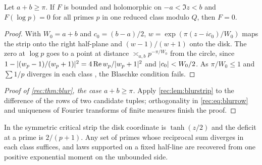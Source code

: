 \begin{lemma}\label{rec:lem:blurstrip}
Let $a+b\ge\pi$. If $F$ is bounded and holomorphic on $-a<\Im z<b$ and $F(\log p)=0$ for all primes $p$ in one reduced
class modulo $Q$, then $F=0$.
\end{lemma}

\begin{proof}
With $W_0=a+b$ and $c_0=(b-a)/2$, $w=\exp(\pi(z-ic_0)/W_0)$ maps the strip onto the right half-plane and $(w-1)/(w+1)$
onto the disk. The zero at $\log p$ goes to a point at distance $\asymp_{a,b}p^{-\pi/W_0}$ from the circle, since
$1-\lvert(w_p-1)/(w_p+1)\rvert^2=4\operatorname{Re} w_p/\lvert w_p+1\rvert^2$ and $\lvert c_0\rvert<W_0/2$. As $\pi/W_0\le1$ and $\sum1/p$ diverges in each class
\cite{Williams1974Mertens}, the Blaschke condition fails.
\end{proof}

\begin{proof}[Proof of \cref{rec:thm:blur}, the case $a+b\ge\pi$]
Apply \cref{rec:lem:blurstrip} to the difference of the rows of two candidate tuples; orthogonality in
\eqref{rec:eq:blurrow} and uniqueness of Fourier transforms of finite measures finish the proof.
\end{proof}

In the symmetric critical strip the disk coordinate is $\tanh(z/2)$ and the deficit at a prime is $2/(p+1)$.
Any set of primes whose reciprocal sum diverges in each class suffices, and laws supported on a fixed
half-line are recovered from one positive exponential moment on the unbounded side.

